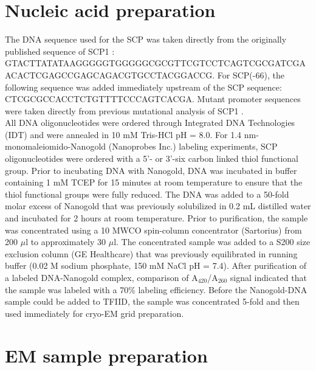 \section{Nucleic acid preparation}

The DNA sequence used for the SCP was taken directly from the originally published sequence of SCP1 \cite{Juven-Gershon_1249}: GTACTTATATAAGGGGGTGGGGGCGCGTTCGTCCTCAGTCGCGATCGAACACTCGAGCCGAGCAGACGTGCCTACGGACCG. For SCP(-66), the following sequence was added immediately upstream of the SCP sequence: CTCGCGCCACCTCTGTTTTCCCAGTCACGA. Mutant promoter sequences were taken directly from previous mutational analysis of SCP1 \cite{Juven-Gershon_1249}.\\
\indent All DNA oligonucleotides were ordered through Integrated DNA Technologies (IDT) and were annealed in 10 mM Tris-HCl pH = 8.0.  For 1.4 nm-monomaleiomido-Nanogold (Nanoprobes Inc.) labeling experiments, SCP oligonucleotides were ordered with a 5'- or 3'-six carbon linked thiol functional group.  Prior to incubating DNA with Nanogold, DNA was incubated in buffer containing 1 mM TCEP for 15 minutes at room temperature to ensure that the thiol functional groups were fully reduced.  The DNA was added to a 50-fold molar excess of Nanogold that was previously solubilized in 0.2 mL distilled water and incubated for 2 hours at room temperature.  Prior to purification, the sample was concentrated using a 10 MWCO spin-column concentrator (Sartorius) from 200 $\mu$l to approximately 30 $\mu$l.  The concentrated sample was added to a S200 size exclusion column (GE Healthcare) that was previously equilibrated in running buffer (0.02 M sodium phosphate, 150 mM NaCl pH = 7.4).  After purification of a labeled DNA-Nanogold complex, comparison of A$_{420}$/A$_{260}$ signal indicated that the sample was labeled with a 70\% labeling efficiency.  Before the Nanogold-DNA sample could be added to TFIID, the sample was concentrated 5-fold and then used immediately for cryo-EM grid preparation. \\

\section{EM sample preparation} 

